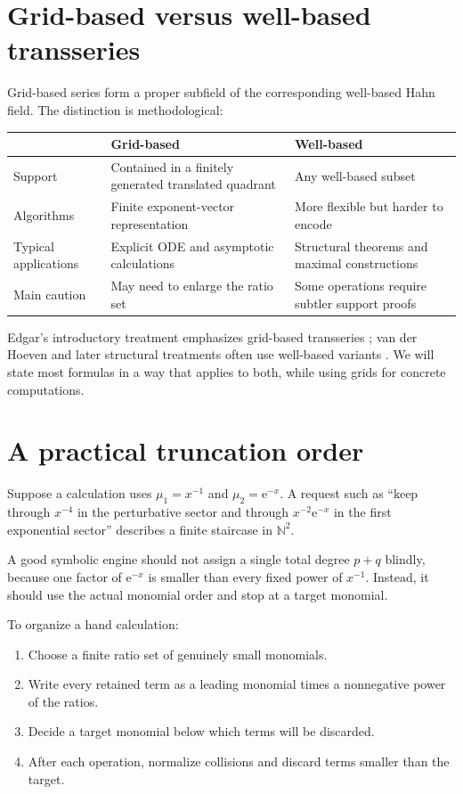\documentclass[11pt,oneside]{book}
\theoremstyle{definition}
\theoremstyle{remark}
\newcommand{\N}{\mathbb{N}}
\newcommand{\e}{\mathrm{e}}
\begin{document}
\section{Grid-based versus well-based transseries}

Grid-based series form a proper subfield of the corresponding well-based Hahn
field. The distinction is methodological:

\begin{center}
\begin{tabularx}{0.94\textwidth}{@{}p{}XX@{}}
\toprule
& \textbf{Grid-based} & \textbf{Well-based}\\
\midrule
Support & Contained in a finitely generated translated quadrant & Any well-based subset\\
Algorithms & Finite exponent-vector representation & More flexible but harder to encode\\
Typical applications & Explicit ODE and asymptotic calculations & Structural theorems and maximal constructions\\
Main caution & May need to enlarge the ratio set & Some operations require subtler support proofs\\
\bottomrule
\end{tabularx}
\end{center}

Edgar's introductory treatment emphasizes grid-based transseries
\cite{EdgarBeginners}; van der Hoeven and later structural treatments often use
well-based variants \cite{vanDerHoevenBook,ADHBook}. We will state most formulas
in a way that applies to both, while using grids for concrete computations.

\section{A practical truncation order}

Suppose a calculation uses $\mu_1=x^{-1}$ and $\mu_2=\e^{-x}$. A request such as
``keep through $x^{-4}$ in the perturbative sector and through $x^{-2}\e^{-x}$ in
the first exponential sector'' describes a finite staircase in $\N^2$.

A good symbolic engine should not assign a single total degree $p+q$ blindly,
because one factor of $\e^{-x}$ is smaller than every fixed power of $x^{-1}$.
Instead, it should use the actual monomial order and stop at a target monomial.

\begin{recipebox}
To organize a hand calculation:
\begin{enumerate}
\item Choose a finite ratio set of genuinely small monomials.
\item Write every retained term as a leading monomial times a nonnegative power
      of the ratios.
\item Decide a target monomial below which terms will be discarded.
\item After each operation, normalize collisions and discard terms smaller than
      the target.
\end{enumerate}
\end{recipebox}
\end{document}
